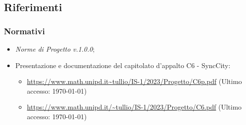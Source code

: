 \documentclass[8pt]{article}
\begin{document}
\subsection{Riferimenti}
\subsubsection{Normativi}
\begin{itemize}
\setlength\itemsep{0em}
	\item \textit{Norme di Progetto v.1.0.0};
	\item Presentazione e documentazione del capitolato d'appalto C6 - SyncCity:
	\begin{itemize}
            \setlength\itemsep{0em}
		\item \href{https://www.math.unipd.it/~tullio/IS-1/2023/Progetto/C6p.pdf}{https://www.math.unipd.it\textasciitilde{}tullio/IS-1/2023/Progetto/C6p.pdf} (Ultimo accesso: \today)
		\item \href{https://www.math.unipd.it/~tullio/IS-1/2023/Progetto/C6.pdf}{https://www.math.unipd.it/\textasciitilde{}tullio/IS-1/2023/Progetto/C6.pdf} (Ultimo accesso: \today)
	\end{itemize}
\end{itemize}
\end{document}
